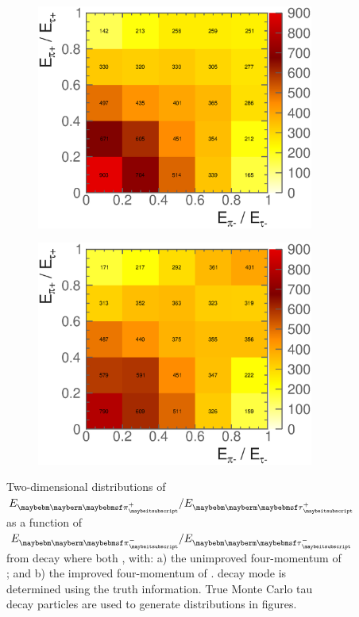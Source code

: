 \begin{figure}[htbp]
\centering %
\begin{subfigure}[b]{0.45\textwidth}
  \includegraphics[width=\textwidth]{tau/NoTimeAnalysis/2DNOimproveKE}
  \caption{}
  \label{fig:TauMini2DNOimproveKE}
\end{subfigure}
\begin{subfigure}[b]{0.45\textwidth}
  \includegraphics[width=\textwidth]{tau/NoTimeAnalysis/2DimproveKE}
  \caption{}
  \label{fig:TauMini2DimproveKE}
\end{subfigure}
\caption
{Two-dimensional distributions of $E_{\Ppiplus}/E_{\APtauon}$ as a function of $E_{\Ppiminus}/E_{\Ptauon}$ from \ZToTauTau decay where both \tauToPionBoth, with: a)   the  unimproved four-momentum of   \ZForTauTau; and b) the   improved four-momentum of   \ZForTauTau.  \tauToPionBoth decay mode is determined using the truth information. True Monte Carlo tau decay particles are used to generate distributions in figures.}
\label{fig:TauMini2DimproveKEAll}
\end{figure}



